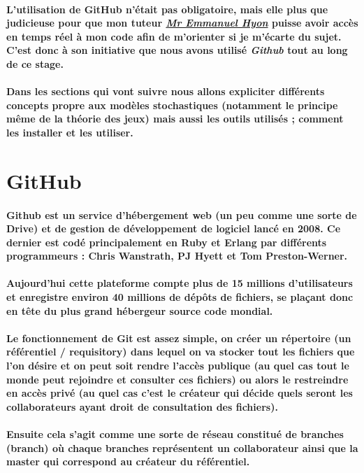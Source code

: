\documentclass[a4paper, 12pt, twoside]{article}
\begin{document}
\paragraph{L'utilisation de GitHub n'était pas obligatoire, mais elle plus que judicieuse pour que mon tuteur \underline{\textit{Mr Emmanuel Hyon}} puisse avoir accès en temps réel à mon code afin de m'orienter si je m'écarte du sujet. C'est donc à son initiative que nous avons utilisé \textit{Github} tout au long de ce stage.}
\paragraph{Dans les sections qui vont suivre nous allons expliciter différents concepts propre aux modèles stochastiques (notamment le principe même de la théorie des jeux) mais aussi les outils utilisés ; comment les installer et les utiliser. }


\section{GitHub}
\paragraph{Github est un service d'hébergement web (un peu comme une sorte de Drive) et de gestion de développement de logiciel lancé en 2008.
Ce dernier est codé principalement en Ruby et Erlang par différents programmeurs : Chris Wanstrath, PJ Hyett et Tom Preston-Werner.}

\paragraph{Aujourd'hui cette plateforme compte plus de 15 millions d'utilisateurs et enregistre environ 40 millions de dépôts de fichiers,
se plaçant donc en tête du plus grand hébergeur source code mondial.}

\paragraph{Le fonctionnement de Git est assez simple, on créer un répertoire (un référentiel / requisitory) dans lequel on va stocker tout les fichiers que l'on désire et on peut soit rendre l'accès publique (au quel cas tout le monde peut rejoindre et consulter ces fichiers) ou alors le  restreindre en accès privé (au quel cas c'est le créateur qui décide quels seront les collaborateurs ayant droit de consultation des fichiers).}
\paragraph{Ensuite cela s'agit comme une sorte de réseau constitué de branches (branch) où chaque branches représentent un collaborateur ainsi que la master qui correspond au créateur du référentiel.}
\end{document}
